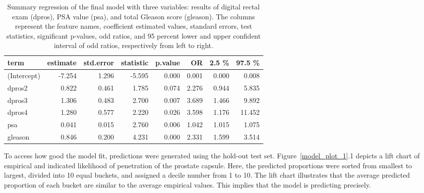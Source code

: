 \documentclass[11pt]{article}\usepackage[]{graphicx}\usepackage[]{color}
\begin{document}
\begin{center}
\begin{table}[ht]
\centering
\begin{tabular}{lrrrrrrr}
  \hline
term & estimate & std.error & statistic & p.value & OR & 2.5 \% & 97.5 \% \\ 
  \hline
(Intercept) & -7.254 & 1.296 & -5.595 & 0.000 & 0.001 & 0.000 & 0.008 \\ 
  dpros2 & 0.822 & 0.461 & 1.785 & 0.074 & 2.276 & 0.944 & 5.835 \\ 
  dpros3 & 1.306 & 0.483 & 2.700 & 0.007 & 3.689 & 1.466 & 9.892 \\ 
  dpros4 & 1.280 & 0.577 & 2.220 & 0.026 & 3.598 & 1.176 & 11.452 \\ 
  psa & 0.041 & 0.015 & 2.760 & 0.006 & 1.042 & 1.015 & 1.075 \\ 
  gleason & 0.846 & 0.200 & 4.231 & 0.000 & 2.331 & 1.599 & 3.514 \\ 
   \hline
\end{tabular}
\caption{Summary regression of the final model with three variables: results of digital rectal exam (dpros), PSA value (psa), and total Gleason score (gleason). The columns represent the feature names, coefficient estimated values, standard errors, test statistics, significant p-values, odd ratios, and 95 percent lower and upper confident interval of odd ratios, respectively from left to right.} 
\label{reg_summary_final}
\end{table}

\end{center}

\noindent To access how good the model fit, predictions were generated using the hold-out test set. Figure~\ref{model_plot_1}.1 depicts a lift chart of empirical and indicated likelihood of penetration of the prostate capsule. Here, the predicted proportions were sorted from smallest to largest, divided into 10 equal buckets, and assigned a decile number from 1 to 10. The lift chart illustrates that the average predicted proportion of each bucket are similar to the average empirical values. This implies that the model is predicting precisely.  
\end{document}
